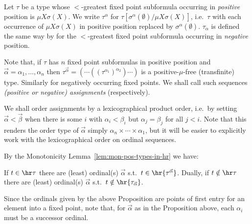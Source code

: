 Let $\tau$ be a type whose $<$-greatest fixed point subformula occurring in \emph{positive} position is $\mu X \sigma(X)$.
We write $\tau^\alpha$ for $\tau[\sigma^\alpha(\emptyset) / \mu X\sigma(X)]$, i.e.\ $\tau$ with each occurrence of $\mu X\sigma(X)$ in positive position replaced by $\sigma^\alpha(\emptyset)$.
$\tau_\alpha$ is defined the same way by for the $<$-greatest fixed point subformula occurring in \emph{negative} position.

Note that, if $\tau$ has $n$ fixed point subformulas in positive position and $\vec \alpha = \alpha_1 ,\dots, \alpha_n$ then $\tau^{\vec \alpha} = (\cdots ((\tau^{\alpha_1})^{\alpha_2})\cdots)$ is a positive-$\mu$-free (transfinite) type.
Similarly for negatively occurring fixed points.
We shall call such sequences \emph{(positive or negative) assignments} (respectively).

We shall order assignments by a lexicographical product order, i.e.\ by setting $\vec \alpha < \vec \beta$ when there is some $i$ with $\alpha_i < \beta_i$ but $\alpha_j = \beta_j$ for all $j<i$. 
Note that this renders the order type of $\vec \alpha$ simply $\alpha_n \times \cdots \times \alpha_1$, but it will be easier to explicitly work with the lexicographical order on ordinal sequences.


By the Monotonicity Lemma~\ref{lem:mon-pos-types-in-hr} we have:
\begin{proposition}
\label{prop:pos-neg-approximants}
If $t \in \hr\tau$ there are (least) ordinal(s) $\vec \alpha$ s.t.\ $t \in \hr{\tau^{\vec \alpha}}$.
% 
Dually, if $t \notin \hr \tau$ there are (least) ordinal(s) $\vec \alpha$ s.t.\ $t \notin \hr{\tau_{\vec \alpha}}$.
\end{proposition}

Since the ordinals given by the above Proposition are points of first entry for an element into a fixed point,
note that, for $\vec \alpha$ as in the Proposition above, each $\alpha_i$ must be a successor ordinal.





